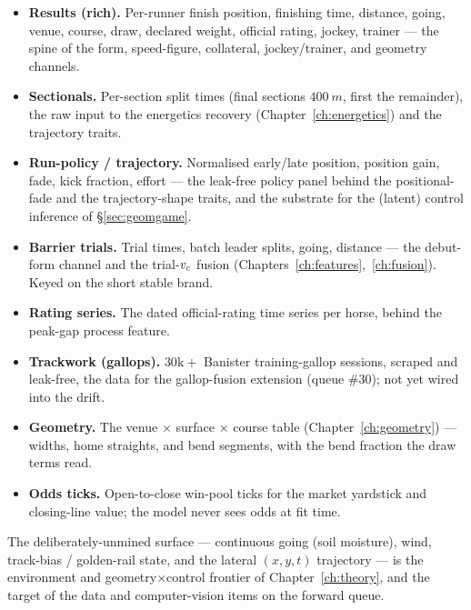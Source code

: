 \begin{itemize}
  \item \textbf{Results (rich).} Per-runner finish position, finishing time, distance, going,
        venue, course, draw, declared weight, official rating, jockey, trainer --- the spine of the
        form, speed-figure, collateral, jockey/trainer, and geometry channels.
  \item \textbf{Sectionals.} Per-section split times (final sections $\SI{400}{m}$, first the
        remainder), the raw input to the energetics recovery (Chapter~\ref{ch:energetics}) and the
        trajectory traits.
  \item \textbf{Run-policy / trajectory.} Normalised early/late position, position gain, fade, kick
        fraction, effort --- the leak-free policy panel behind the positional-fade and the
        trajectory-shape traits, and the substrate for the (latent) control inference of
        \S\ref{sec:geomgame}.
  \item \textbf{Barrier trials.} Trial times, batch leader splits, going, distance --- the
        debut-form channel and the trial-${v_{c}}$ fusion (Chapters~\ref{ch:features},~\ref{ch:fusion}).
        Keyed on the short stable brand.
  \item \textbf{Rating series.} The dated official-rating time series per horse, behind the
        peak-gap process feature.
  \item \textbf{Trackwork (gallops).} $30\text{k}+$ Banister training-gallop sessions, scraped and
        leak-free, the data for the gallop-fusion extension (queue \#30); not yet wired into the
        drift.
  \item \textbf{Geometry.} The venue $\times$ surface $\times$ course  table
        (Chapter~\ref{ch:geometry}) --- widths, home straights, and bend segments, with the bend
        fraction the draw terms read.
  \item \textbf{Odds ticks.} Open-to-close win-pool ticks for the market yardstick and closing-line
        value; the model never sees odds at fit time.
\end{itemize}

The deliberately-unmined surface --- continuous going (soil moisture), wind, track-bias / golden-rail
state, and the lateral $(x,y,t)$ trajectory --- is the environment and geometry$\times$control
frontier of Chapter~\ref{ch:theory}, and the target of the data and computer-vision items on the
forward queue.
